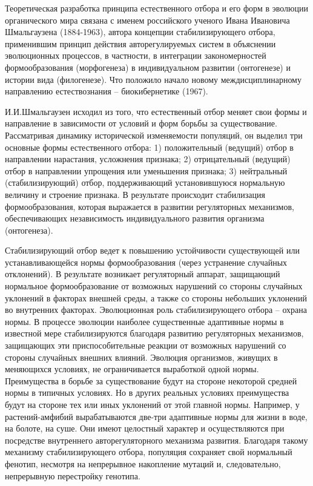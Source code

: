 \documentclass[exam_answers.tex]{subfiles}
\begin{document}
\renewcommand{\baselinestretch}{\blch}

Теоретическая разработка принципа естественного отбора и его форм в
эволюции органического мира связана с именем российского ученого Ивана
Ивановича Шмальгаузена (1884-1963), автора концепции стабилизирующего
отбора, применившим принцип действия авторегулируемых систем в
объяснении эволюционных процессов, в частности, в интеграции
закономерностей формообразования (морфогенеза) в индивидуальном развитии
(онтогенезе) и истории вида (филогенезе). Что положило начало новому
междисциплинарному направлению естествознания – биокибернетике (1967).

И.И.Шмальгаузен исходил из того, что естественный отбор меняет свои
формы и направление в зависимости от условий и форм борьбы за
существование. Рассматривая динамику исторической изменяемости
популяций, он выделил три основные формы естественного отбора: 1)
положительный (ведущий) отбор в направлении нарастания, усложнения
признака; 2) отрицательный (ведущий) отбор в направлении упрощения или
уменьшения признака; 3) нейтральный (стабилизирующий) отбор,
поддерживающий установившуюся нормальную величину и строение признака.
В результате происходит стабилизация формообразования, которая выражается
в развитии регуляторных механизмов, обеспечивающих независимость
индивидуального развития организма (онтогенеза).

Стабилизирующий отбор ведет к повышению устойчивости
существующей или устанавливающейся нормы формообразования (через
устранение случайных отклонений). В результате возникает регуляторный
аппарат, защищающий нормальное формообразование от возможных
нарушений со стороны случайных уклонений в факторах внешней среды, а
также со стороны небольших уклонений во внутренних факторах.
Эволюционная роль стабилизирующего отбора – охрана нормы. В
процессе эволюции наиболее существенные адаптивные нормы в известной
мере стабилизируются благодаря развитию регуляторных механизмов,
защищающих эти приспособительные реакции от возможных нарушений со
стороны случайных внешних влияний. Эволюция организмов, живущих в
меняющихся условиях, не ограничивается выработкой одной нормы.
Преимущества в борьбе за существование будут на стороне некоторой средней
нормы в типичных условиях. Но в других реальных условиях преимущества
будут на стороне тех или иных уклонений от этой главной нормы. Например, у
растений-амфибий вырабатываются две-три адаптивные нормы для жизни в
воде, на болоте, на суше. Они имеют целостный характер и осуществляются
при посредстве внутреннего авторегуляторного механизма развития. Благодаря
такому механизму стабилизирующего отбора, популяция сохраняет свой
нормальный фенотип, несмотря на непрерывное накопление мутаций и,
следовательно, непрерывную перестройку генотипа.
\end{document}

